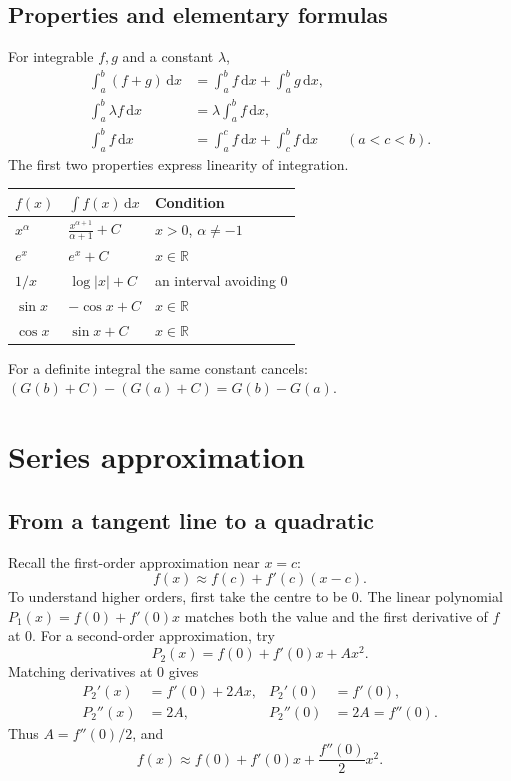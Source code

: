 \subsection{Properties and elementary formulas}
For integrable $f,g$ and a constant $\lambda$,
\begin{align*}
 \int_a^b(f+g)\,\mathrm dx
   &=\int_a^b f\,\mathrm dx+\int_a^b g\,\mathrm dx,\\
 \int_a^b\lambda f\,\mathrm dx
   &=\lambda\int_a^b f\,\mathrm dx,\\
 \int_a^b f\,\mathrm dx
   &=\int_a^c f\,\mathrm dx+\int_c^b f\,\mathrm dx
      \qquad(a<c<b).
\end{align*}
The first two properties express linearity of integration.

\begin{center}
\begin{tabular}{lll}
\toprule
$f(x)$ & $\displaystyle\int f(x)\,\mathrm dx$ & Condition\\[5pt]
\midrule
$x^\alpha$ & $\displaystyle\frac{x^{\alpha+1}}{\alpha+1}+C$
 & $x>0$, $\alpha\ne-1$\\[9pt]
$e^x$ & $e^x+C$ & $x\in\mathbb R$\\[4pt]
$1/x$ & $\log|x|+C$ & an interval avoiding $0$\\[4pt]
$\sin x$ & $-\cos x+C$ & $x\in\mathbb R$\\[4pt]
$\cos x$ & $\sin x+C$ & $x\in\mathbb R$\\
\bottomrule
\end{tabular}
\end{center}
For a definite integral the same constant cancels:
$(G(b)+C)-(G(a)+C)=G(b)-G(a)$.

\section{Series approximation}

\subsection{From a tangent line to a quadratic}
Recall the first-order approximation near $x=c$:
\[
 f(x)\approx f(c)+f'(c)(x-c).
\]
To understand higher orders, first take the centre to be $0$.
The linear polynomial $P_1(x)=f(0)+f'(0)x$ matches both the value and
the first derivative of $f$ at $0$.
For a second-order approximation, try
\[
 P_2(x)=f(0)+f'(0)x+Ax^2.
\]
Matching derivatives at $0$ gives
\begin{align*}
 P_2'(x)&=f'(0)+2Ax,& P_2'(0)&=f'(0),\\
 P_2''(x)&=2A,& P_2''(0)&=2A=f''(0).
\end{align*}
Thus $A=f''(0)/2$, and
\[
 f(x)\approx f(0)+f'(0)x+\frac{f''(0)}2x^2.
\]

